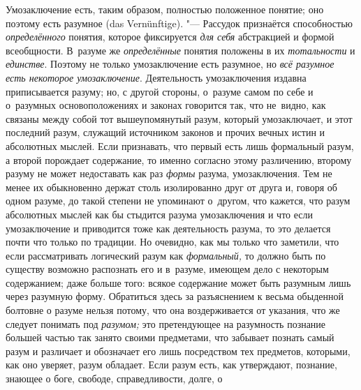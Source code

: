 Умозаключение есть, таким образом, полностью положенное понятие; оно поэтому
есть разумное (das Vernünftige). "--- Рассудок признаётся способностью
{\em определённого} понятия, которое фиксируется {\em для себя} абстракцией
и формой всеобщности. В~разуме же {\em определённые} понятия положены в их
{\em тотальности} и {\em единстве}. Поэтому не только умозаключение есть
разумное, но {\em всё разумное есть некоторое умозаключение}. Деятельность
умозаключения издавна приписывается разуму; но, с другой стороны, о~разуме
самом по себе и о~разумных основоположениях и законах говорится так, что
не~видно, как связаны между собой тот вышеупомянутый разум, который
умозаключает, и этот последний разум, служащий источником законов и прочих
вечных истин и абсолютных мыслей. Если признавать, что первый есть лишь
формальный разум, а второй порождает содержание, то именно согласно этому
различению, второму разуму не может недоставать как раз {\em формы} разума,
умозаключения. Тем не менее их обыкновенно держат столь изолированно друг
от друга и, говоря об одном разуме, до такой степени не упоминают
о~другом, что кажется, что разум абсолютных мыслей как бы
стыдится разума умозаключения и что если умозаключение и приводится тоже
как деятельность разума, то это делается почти что только по традиции. Но
очевидно, как мы только что заметили, что если рассматривать логический разум
как {\em формальный,} то должно быть по существу возможно распознать его и
в~разуме, имеющем дело с некоторым содержанием; даже больше того: всякое
содержание может быть разумным лишь через разумную форму. Обратиться здесь
за разъяснением к весьма обыденной болтовне о разуме нельзя потому, что она
воздерживается от указания, что же следует понимать под {\em разумом;} это
претендующее на разумность познание
большей частью так занято своими предметами, что забывает
познать самый разум и различает и обозначает его лишь посредством тех
предметов, которыми, как оно уверяет, разум обладает. Если разум есть, как
утверждают, познание, знающее о боге, свободе, справедливости, долге, о
